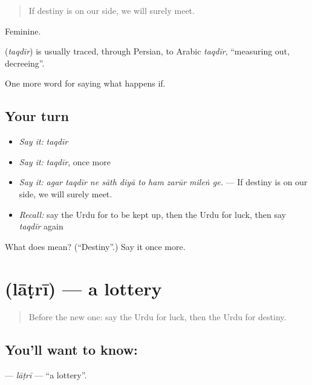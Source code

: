 \begin{quote}
If destiny is on our side, we will surely meet.
\end{quote}

Feminine.

\begin{cousinweb}
\textbf{} (\emph{taqdīr}) is usually traced, through Persian, to Arabic \emph{taqdīr}, \textquotedblleft{}measuring out, decreeing\textquotedblright{}.
\end{cousinweb}

\begin{grammarlens}[title={What you've built}]
One more word for saying what happens if.
\end{grammarlens}

\subsection*{Your turn}
\begin{itemize}
\raggedright
  \item \emph{Say it:} \emph{taqdīr}
  \item \emph{Say it:} \emph{taqdīr}, once more
  \item \emph{Say it:} \emph{agar taqdīr ne sāth diyā to ham zarūr mileṅ ge.} — If destiny is on our side, we will surely meet.
  \item \emph{Recall:} say the Urdu for to be kept up, then the Urdu for luck, then say \emph{taqdīr} again
\end{itemize}

\begin{tcolorbox}[breakable,colback=teal!4,colframe=teal!35!black,title={Before you move on}]
What does  mean? (\textquotedblleft{}Destiny\textquotedblright{}.) Say it once more.
\end{tcolorbox}
\section[\texorpdfstring{\ur{لاٹری} (lāṭrī)}{لاٹری (lāṭrī)}]{ (lāṭrī) — a lottery}

\label{lesson:UR-C532-latri}



\begin{quote}
Before the new one: say the Urdu for luck, then the Urdu for destiny.
\end{quote}

\subsection*{You'll want to know: }
\textbf{} — \emph{lāṭrī} — \textquotedblleft{}a lottery\textquotedblright{}.


